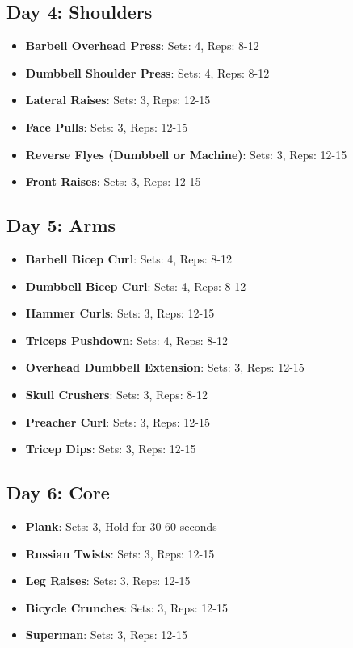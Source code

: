 \documentclass{article}
\begin{document}
\subsection*{Day 4: Shoulders}
\begin{itemize}
    \item \textbf{Barbell Overhead Press}: Sets: 4, Reps: 8-12
    \item \textbf{Dumbbell Shoulder Press}: Sets: 4, Reps: 8-12
    \item \textbf{Lateral Raises}: Sets: 3, Reps: 12-15
    \item \textbf{Face Pulls}: Sets: 3, Reps: 12-15
    \item \textbf{Reverse Flyes (Dumbbell or Machine)}: Sets: 3, Reps: 12-15
    \item \textbf{Front Raises}: Sets: 3, Reps: 12-15
\end{itemize}

\subsection*{Day 5: Arms}
\begin{itemize}
    \item \textbf{Barbell Bicep Curl}: Sets: 4, Reps: 8-12
    \item \textbf{Dumbbell Bicep Curl}: Sets: 4, Reps: 8-12
    \item \textbf{Hammer Curls}: Sets: 3, Reps: 12-15
    \item \textbf{Triceps Pushdown}: Sets: 4, Reps: 8-12
    \item \textbf{Overhead Dumbbell Extension}: Sets: 3, Reps: 12-15
    \item \textbf{Skull Crushers}: Sets: 3, Reps: 8-12
    \item \textbf{Preacher Curl}: Sets: 3, Reps: 12-15
    \item \textbf{Tricep Dips}: Sets: 3, Reps: 12-15
\end{itemize}

\subsection*{Day 6: Core}
\begin{itemize}
    \item \textbf{Plank}: Sets: 3, Hold for 30-60 seconds
    \item \textbf{Russian Twists}: Sets: 3, Reps: 12-15
    \item \textbf{Leg Raises}: Sets: 3, Reps: 12-15
    \item \textbf{Bicycle Crunches}: Sets: 3, Reps: 12-15
    \item \textbf{Superman}: Sets: 3, Reps: 12-15
\end{itemize}
\end{document}
